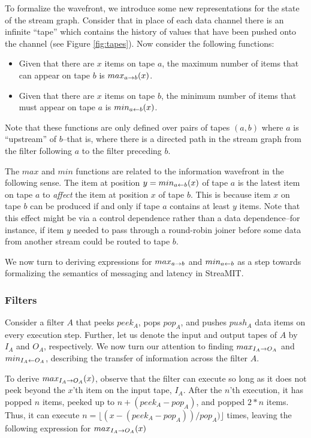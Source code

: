 To formalize the wavefront, we introduce some new representations for
the state of the stream graph.  Consider that in place of each data
channel there is an infinite ``tape'' which contains the history of
values that have been pushed onto the channel (see Figure
\ref{fig:tapes}).  Now consider the following functions:
\begin{itemize}
\item Given that there are $x$ items on tape $a$, the maximum number
of items that can appear on tape $b$ is $max_{a \rightarrow b}(x)$.

\item Given that there are $x$ items on tape $b$, the minimum number
of items that must appear on tape $a$ is $min_{a \leftarrow b}(x)$.
\end{itemize}
Note that these functions are only defined over pairs of tapes $(a,
b)$ where $a$ is ``upstream'' of $b$--that is, where there is a
directed path in the stream graph from the filter following $a$ to the
filter preceding $b$.

The $max$ and $min$ functions are related to the information wavefront
in the following sense.  The item at position $y = min_{a \leftarrow b}(x)$ of
tape $a$ is the latest item on tape $a$ to {\it affect} the item at
position $x$ of tape $b$.  This is because item $x$ on tape $b$ can be
produced if and only if tape $a$ contains at least $y$ items.  Note
that this effect might be via a control dependence rather than a data
dependence--for instance, if item $y$ needed to pass through a
round-robin joiner before some data from another stream could be
routed to tape $b$.

We now turn to deriving expressions for $max_{a \rightarrow b}$ and $min_{a \leftarrow b}$ as
a step towards formalizing the semantics of messaging and latency in
StreaMIT.

\subsubsection{Filters}

Consider a filter $A$ that peeks $peek_A$, pops $pop_A$, and pushes
$push_A$ data items on every execution step.  Further, let us denote
the input and output tapes of $A$ by $I_A$ and $O_A$, respectively.
We now turn our attention to finding $max_{I_A \rightarrow O_A}$ and
$min_{I_A \leftarrow O_A}$, describing the transfer of information across the
filter $A$.

To derive $max_{I_A \rightarrow O_A}(x)$, observe that the filter can execute so
long as it does not peek beyond the $x$'th item on the input tape,
$I_A$.  After the $n$'th execution, it has popped $n$ items, peeked up
to $n + (peek_A - pop_A)$, and popped $2 * n$ items.  Thus, it can
execute $n = \lfloor(x - (peek_A - pop_A)) / pop_A)\rfloor$ times, leaving
the following expression for $max_{I_A \rightarrow O_A}(x)$

